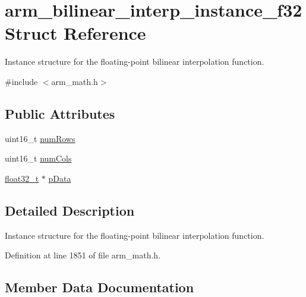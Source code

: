 \hypertarget{structarm__bilinear__interp__instance__f32}{}\section{arm\+\_\+bilinear\+\_\+interp\+\_\+instance\+\_\+f32 Struct Reference}
\label{structarm__bilinear__interp__instance__f32}


Instance structure for the floating-\/point bilinear interpolation function.  




{\ttfamily \#include $<$arm\+\_\+math.\+h$>$}

\subsection*{Public Attributes}
\begin{DoxyCompactItemize}
\item 
uint16\+\_\+t \hyperlink{structarm__bilinear__interp__instance__f32_a34f2b17cc57b95011960df9718af6ed6}{num\+Rows}
\item 
uint16\+\_\+t \hyperlink{structarm__bilinear__interp__instance__f32_aede17bebfb1f835b61d71dd813eab3f8}{num\+Cols}
\item 
\hyperlink{arm__math_8h_a4611b605e45ab401f02cab15c5e38715}{float32\+\_\+t} $\ast$ \hyperlink{structarm__bilinear__interp__instance__f32_afd1e764591c991c212d56c893efb5ea4}{p\+Data}
\end{DoxyCompactItemize}


\subsection{Detailed Description}
Instance structure for the floating-\/point bilinear interpolation function. 

Definition at line 1851 of file arm\+\_\+math.\+h.



\subsection{Member Data Documentation}
\mbox{\label{structarm__bilinear__interp__instance__f32_aede17bebfb1f835b61d71dd813eab3f8}} 
